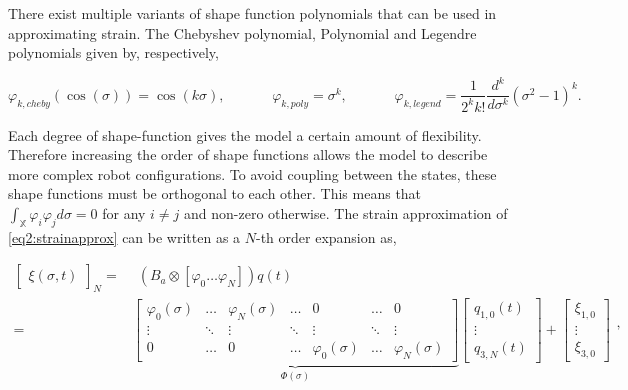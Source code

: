 There exist multiple variants of shape function polynomials that can be used in approximating strain. The Chebyshev polynomial, Polynomial and Legendre polynomials given by, respectively,

\begin{equation}
    \varphi_{k,cheby}(\cos(\sigma)) = \cos(k \sigma), \hspace{40pt} \varphi_{k,poly} = \sigma^k, \hspace{40pt} \varphi_{k,legend} = \frac{1}{2^k k!} \frac{d^k}{d\sigma^k}(\sigma^2-1)^k.
    \label{eq2:shapefunction}
\end{equation}


Each degree of shape-function gives the model a certain amount of flexibility. Therefore increasing the order of shape functions allows the model to describe more complex robot configurations. To avoid coupling between the states, these shape functions must be orthogonal to each other. This means that $\int_\mathbb{X} \varphi_i \varphi_j d \sigma = 0$ for any $i \neq j$ and non-zero otherwise. The strain approximation of \ref{eq2:strainapprox} can be written as a $N$-th order expansion as,



\begin{equation}
\begin{aligned}
    \begin{bmatrix}\xi(\sigma,t)\end{bmatrix}_N = & \hspace{5pt}  (B_a \otimes [ \varphi_0 \dots \varphi_N ])q(t)\\ = &  \underbrace{ \begin{bmatrix}
    \varphi_0(\sigma) & \dots  & \varphi_N(\sigma) & \dots     & 0      & \dots  &  0 \\
    \vdots    & \ddots & \vdots    & \ddots    & \vdots & \ddots & \vdots \\
    0         & \dots  & 0         & \dots     & \varphi_0(\sigma) & \dots & \varphi_N (\sigma)
    \end{bmatrix}}_{\Phi(\sigma)} \begin{bmatrix} q_{1,0}(t) \\ \vdots \\ q_{3,N}(t) \end{bmatrix} +  \begin{bmatrix} \xi_{1,0} \\ \vdots \\ \xi_{3,0}   \end{bmatrix}
    \end{aligned},
\label{eq2:xishape}
\end{equation}

